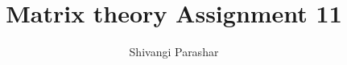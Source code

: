 \documentclass[journal,12pt,twocolumn]{IEEEtran}
\begin{document}
\makeatletter
{}
\makeatother
\let\StandardTheFigure\thefigure
\let\vec\mathbf
\renewcommand{\thefigure}{\theproblem}
\def\putbox#1#2#3{\makebox[0in][l]{\makebox[#1][l]{}\raisebox{\baselineskip}[0in][0in]{\raisebox{#2}[0in][0in]{#3}}}}
     \def\rightbox#1{\makebox[0in][r]{#1}}
     \def\centbox#1{\makebox[0in]{#1}}
     \def\topbox#1{\raisebox{-\baselineskip}[0in][0in]{#1}}
     \def\midbox#1{\raisebox{-0.5\baselineskip}[0in][0in]{#1}}
\vspace{3cm}
\title{Matrix theory Assignment 11}
\author{Shivangi Parashar}
%
%
%
% 
%
\end{document}
